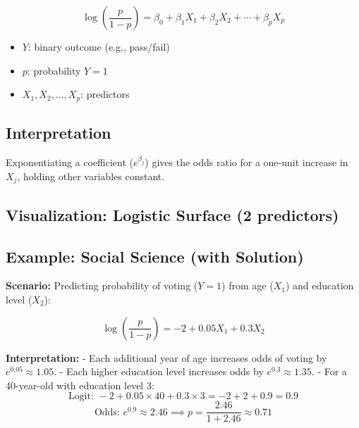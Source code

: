 \documentclass[11pt]{article}
\begin{document}
\[
\log\left(\frac{p}{1-p}\right) = \beta_0 + \beta_1 X_1 + \beta_2 X_2 + \cdots + \beta_p X_p
\]
\begin{itemize}
    \item $Y$: binary outcome (e.g., pass/fail)
    \item $p$: probability $Y=1$
    \item $X_1, X_2, \ldots, X_p$: predictors
\end{itemize}

\subsection{Interpretation}

Exponentiating a coefficient ($e^{\beta_j}$) gives the odds ratio for a one-unit increase in $X_j$, holding other variables constant.

\subsection*{Visualization: Logistic Surface (2 predictors)}
\begin{center}
\end{center}

\subsection{Example: Social Science (with Solution)}

\textbf{Scenario:} Predicting probability of voting ($Y=1$) from age ($X_1$) and education level ($X_2$):

\[
\log\left(\frac{p}{1-p}\right) = -2 + 0.05 X_1 + 0.3 X_2
\]

\textbf{Interpretation:}
- Each additional year of age increases odds of voting by $e^{0.05} \approx 1.05$.
- Each higher education level increases odds by $e^{0.3} \approx 1.35$.
- For a 40-year-old with education level 3:
\[
\text{Logit: } -2 + 0.05 \times 40 + 0.3 \times 3 = -2 + 2 + 0.9 = 0.9
\]
\[
\text{Odds: } e^{0.9} \approx 2.46 \implies p = \frac{2.46}{1+2.46} \approx 0.71
\]
\end{document}

